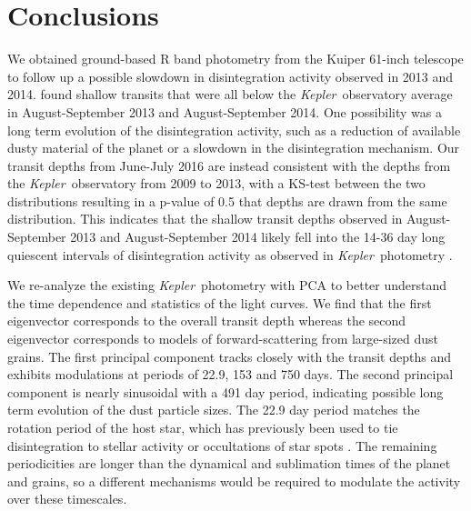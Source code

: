 \documentclass[preprint]{aastex61}
\newcommand{\kepler}{{\it Kepler}}
\begin{document}
%
%



\section{Conclusions}\label{sec:conclusions}

We obtained ground-based R band photometry from the Kuiper 61-inch telescope to follow up a possible slowdown in disintegration activity observed in 2013 and 2014.
\citet{schlawin2016kic1255} found shallow transits that were all below the \kepler\ observatory average in August-September 2013 and August-September 2014.
One possibility was a long term evolution of the disintegration activity, such as a reduction of available dusty material of the planet or a slowdown in the disintegration mechanism.
Our transit depths from June-July 2016 are instead consistent with the depths from the \kepler\ observatory from 2009 to 2013, with a KS-test between the two distributions resulting in a p-value of 0.5 that depths are drawn from the same distribution.
This indicates that the shallow transit depths observed in August-September 2013 and August-September 2014 likely fell into the 14-36 day long quiescent intervals of disintegration activity as observed in \kepler\ photometry \citep{kawahara2013starspots,vanWerkhoven2014,croll2015starspots}.

We re-analyze the existing \kepler\ photometry with PCA to better understand the time dependence and statistics of the light curves.
We find that the first eigenvector corresponds to the overall transit depth whereas the second eigenvector corresponds to models of forward-scattering from  large-sized dust grains.
The first principal component tracks closely with the transit depths and exhibits modulations at periods of 22.9, 153 and 750 days.
The second principal component is nearly sinusoidal with a 491 day period, indicating possible long term evolution of the dust particle sizes.
The 22.9 day period matches the rotation period of the host star, which has previously been used to tie disintegration to stellar activity \citep{kawahara2013starspots} or occultations of star spots \citep{croll2015starspots}.
The remaining periodicities are longer than the dynamical and sublimation times of the planet and grains, so a different mechanisms would be required to modulate the activity over these timescales.
\end{document}
